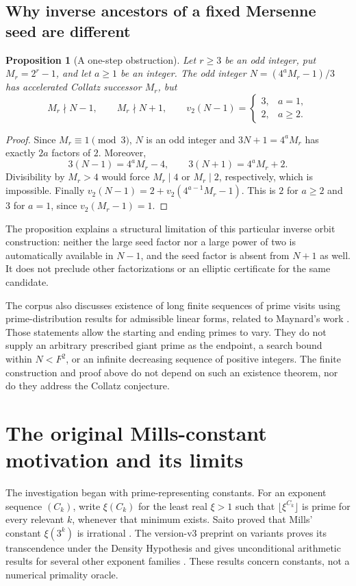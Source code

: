 \documentclass[11pt,a4paper]{article}
\newtheorem{proposition}[theorem]{Proposition}
\theoremstyle{definition}\newtheorem{definition}[theorem]{Definition}
\theoremstyle{remark}\newtheorem{remark}[theorem]{Remark}
\begin{document}
\subsection{Why inverse ancestors of a fixed Mersenne seed are different}

\begin{proposition}[A one-step obstruction]\label{prop:inverse}
Let $r\ge3$ be an odd integer, put $M_r=2^r-1$, and let $a\ge1$ be an
integer. The odd integer
$N=(4^aM_r-1)/3$ has accelerated Collatz successor $M_r$, but
\[
 M_r\nmid N-1,\qquad M_r\nmid N+1,
 \qquad
 v_2(N-1)=\begin{cases}3,&a=1,\\2,&a\ge2.\end{cases}
\]
\end{proposition}
\begin{proof}
Since $M_r\equiv1\pmod3$, $N$ is an odd integer and
$3N+1=4^aM_r$ has exactly $2a$ factors of $2$. Moreover,
\[
 3(N-1)=4^aM_r-4,\qquad3(N+1)=4^aM_r+2.
\]
Divisibility by $M_r>4$ would force $M_r\mid4$ or $M_r\mid2$, respectively,
which is impossible. Finally
$v_2(N-1)=2+v_2(4^{a-1}M_r-1)$. This is $2$ for $a\ge2$ and $3$ for
$a=1$, since $v_2(M_r-1)=1$.
\end{proof}

The proposition explains a structural limitation of this particular inverse
orbit construction: neither the large seed factor nor a large power of two
is automatically available in $N-1$, and the seed factor is absent from
$N+1$ as well. It does not preclude other factorizations or an elliptic
certificate for the same candidate.

The corpus also discusses existence of long finite sequences of prime visits
using prime-distribution results for admissible linear forms, related to
Maynard's work \cite{maynard}. Those statements allow the starting and ending
primes to vary. They do not supply an arbitrary prescribed giant prime as
the endpoint, a search bound within $N<F^2$, or an infinite decreasing
sequence of positive integers. The finite construction and proof above do
not depend on such an existence theorem, nor do they address the Collatz
conjecture.

\section{The original Mills-constant motivation and its limits}
\label{sec:mills}

The investigation began with prime-representing constants. For an exponent
sequence $(C_k)$, write $\xi(C_k)$ for the least real $\xi>1$ such that
$\lfloor\xi^{C_k}\rfloor$ is prime for every relevant $k$, whenever that
minimum exists. Saito proved that Mills' constant $\xi(3^k)$ is irrational
\cite{saito-irr}. The version-v3 preprint on variants proves its
transcendence under the Density Hypothesis and gives unconditional arithmetic
results for several other exponent families \cite{saito-var}. These results
concern constants, not a numerical primality oracle.
\end{document}
